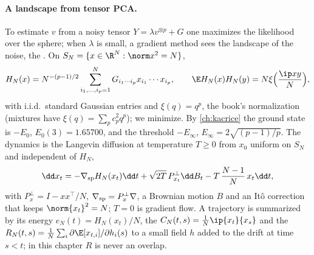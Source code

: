 \begin{refsection}
\paragraph{A landscape from tensor PCA.} To estimate $v$ from a noisy tensor $Y=\lambda v^{\otimes p}+G$ one maximizes the likelihood over the sphere; when $\lambda$ is small, a gradient method sees the landscape of the noise, the . On $S_N=\{x\in\R^N:\norm x^2=N\}$,
\[
H_N(x)=N^{-(p-1)/2}\sum_{i_1,\dots,i_p=1}^NG_{i_1\cdots i_p}x_{i_1}\cdots x_{i_p},\qquad\E H_N(x)H_N(y)=N\xi\Bigl(\frac{\ip xy}N\Bigr),
\]
with i.i.d.\ standard Gaussian entries and $\xi(q)=q^p$, the book's normalization (mixtures have $\xi(q)=\sum_pc_p^2q^p$); we minimize. By \cref{ch:kacrice} the ground state is $-E_0$, $E_0(3)=1.65700$, and the threshold $-E_\infty$, $E_\infty=2\sqrt{(p-1)/p}$. The dynamics is the Langevin diffusion at temperature $T\ge0$ from $x_0$ uniform on $S_N$ and independent of $H_N$,
\begin{equation}\label{eq:dmft:langevin}
\dd x_t=-\nabla_{\dmftsp}H_N(x_t)\dd t+\sqrt{2T}\,P^\perp_{x_t}\dd B_t-T\,\frac{N-1}N\,x_t\dd t,
\end{equation}
with $P^\perp_x=I-xx^\top/N$, $\nabla_{\mathrm{sp}}=P^\perp_x\nabla$, a Brownian motion $B$ and an Itô correction that keeps $\norm{x_t}^2=N$; $T=0$ is gradient flow. A trajectory is summarized by its energy $e_N(t)=H_N(x_t)/N$, the  $C_N(t,s)=\frac1N\ip{x_t}{x_s}$ and the  $R_N(t,s)=\frac1N\sum_i\partial\E[x_{t,i}]/\partial h_i(s)$ to a small field $h$ added to the drift at time $s<t$; in this chapter $R$ is never an overlap.


\end{refsection}
